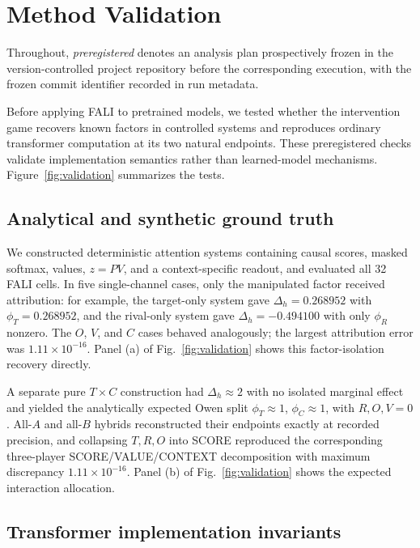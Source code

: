 \section{Method Validation}\label{sec:validation}

Throughout, \emph{preregistered} denotes an analysis plan prospectively frozen in the version-controlled project repository before the corresponding execution, with the frozen commit identifier recorded in run metadata.

Before applying FALI to pretrained models, we tested whether the intervention game recovers known factors in controlled systems and reproduces ordinary transformer computation at its two natural endpoints. These preregistered checks validate implementation semantics rather than learned-model mechanisms. Figure~\ref{fig:validation} summarizes the tests.



\subsection{Analytical and synthetic ground truth}\label{sec:synthetic}

We constructed deterministic attention systems containing causal scores, masked softmax, values, $z=PV$, and a context-specific readout, and evaluated all 32 FALI cells. In five single-channel cases, only the manipulated factor received attribution: for example, the target-only system gave $\Delta_h=0.268952$ with $\phi_T=0.268952$, and the rival-only system gave $\Delta_h=-0.494100$ with only $\phi_R$ nonzero. The $O$, $V$, and $C$ cases behaved analogously; the largest attribution error was $1.11\times10^{-16}$. Panel (a) of Fig.~\ref{fig:validation} shows this factor-isolation recovery directly.

A separate pure $T\times C$ construction had $\Delta_h\approx2$ with no isolated marginal effect and yielded the analytically expected Owen split $\phi_T\approx1$, $\phi_C\approx1$, with $R,O,V=0$. All-$A$ and all-$B$ hybrids reconstructed their endpoints exactly at recorded precision, and collapsing $T,R,O$ into SCORE reproduced the corresponding three-player SCORE/VALUE/CONTEXT decomposition with maximum discrepancy $1.11\times10^{-16}$. Panel (b) of Fig.~\ref{fig:validation} shows the expected interaction allocation.

\subsection{Transformer implementation invariants}\label{sec:implementation-validation}

